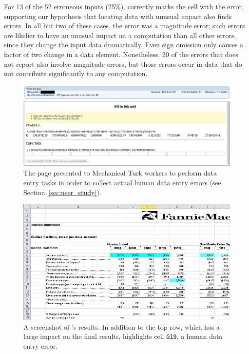 For 13 of the 52 erroneous inputs (25\%), \checkcell{} correctly marks
the cell with the error, supporting our hypothesis that locating data
with unusual impact also finds errors. In all but two of these cases,
the error was a magnitude error; such errors are likelier to have an
unusual impact on a computation than all other errors, since they
change the input data dramatically. Even sign omission only causes a
factor of two change in a data element. Nonetheless, 20 of the errors
that \checkcell{} does not report also involve magnitude errors, but
those errors occur in data that do not contribute significantly to any
computation.


\begin{figure}[!t]
\centering
\includegraphics[width=5.5in]{images/mturk_fuzz_task}
  \caption{The page presented to Mechanical Turk workers to perform data entry tasks in order to collect actual human data entry errors (see Section~\ref{sec:user_study}).\label{fig:mturk_task}}
\end{figure}


\begin{figure}[!t]
\centering
\includegraphics[width=5.5in]{images/fannie_mae_outlier}
  \caption{A screenshot of \checkcell{}'s results. In addition to the top row, which has a large impact on the final results, \checkcell{} highlights cell \texttt{G19}, a human data entry error.\label{fig:fannie_mae}}
\end{figure}

